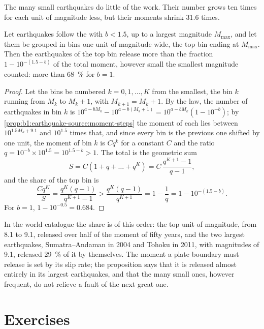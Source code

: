The many small earthquakes do little of the work. Their number grows ten times
for each unit of magnitude less, but their moments shrink 31.6 times.

\begin{proposition}\label{prop:b1:earthquake-source:largest}
Let earthquakes follow the  with $b < 1.5$, up to a
largest magnitude $M_{\max}$, and let them be grouped in bins one unit of
magnitude wide, the top bin ending at $M_{\max}$. Then the earthquakes of the top
bin release more than the fraction $1 - 10^{-(1.5 - b)}$ of the total moment,
however small the smallest magnitude counted: more than \qty{68}{\percent} for
$b = 1$.
\end{proposition}

\begin{proof}
Let the bins be numbered $k = 0, 1, \dots, K$ from the smallest, the bin $k$
running from $M_k$ to $M_k + 1$, with $M_{k+1} = M_k + 1$. By the law, the number
of earthquakes in bin $k$ is $10^{a - bM_k} - 10^{a - b(M_k+1)} =
10^{a - bM_k}(1 - 10^{-b})$; by \cref{prop:b1:earthquake-source:moment-steps}
the moment of each lies between $10^{1.5M_k + 9.1}$ and $10^{1.5}$ times that,
and since every bin is the previous one shifted by one unit, the moment of
bin $k$ is $C q^k$ for a constant $C$ and the ratio
$q = 10^{-b}\times10^{1.5} = 10^{1.5 - b} > 1$. The total is the geometric sum
\[
  S = C(1 + q + \dots + q^K) = C\,\frac{q^{K+1} - 1}{q - 1} ,
\]
and the share of the top bin is
\[
  \frac{C q^K}{S} = \frac{q^K (q - 1)}{q^{K+1} - 1}
  > \frac{q^K (q - 1)}{q^{K+1}} = 1 - \frac1q = 1 - 10^{-(1.5 - b)} .
\]
For $b = 1$, $1 - 10^{-0.5} = 0.684$.
\end{proof}

In the world catalogue the share is of this order: the top unit of magnitude,
from 8.1 to 9.1, released over half of the moment of fifty years, and the two
largest earthquakes, Sumatra--Andaman in 2004 and Tohoku in 2011, with
magnitudes of 9.1, released \qty{29}{\percent} of it by themselves. The moment a
plate boundary must release is set by its slip rate; the proposition says that
it is released almost entirely in its largest earthquakes, and that the many
small ones, however frequent, do not relieve a fault of the next great one.

\section{Exercises}


